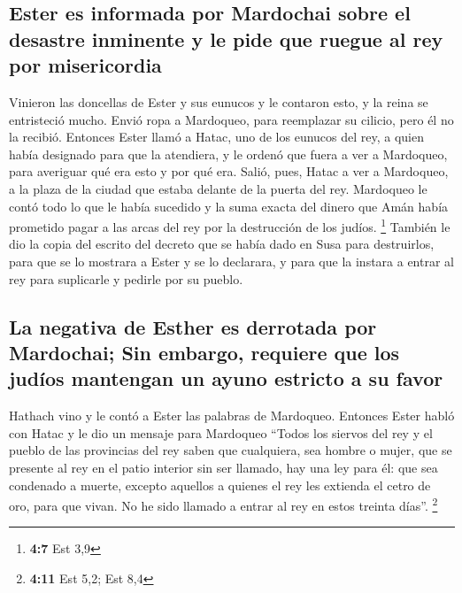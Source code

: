 \hypertarget{ester-es-informada-por-mardochai-sobre-el-desastre-inminente-y-le-pide-que-ruegue-al-rey-por-misericordia}{%
\subsection{Ester es informada por Mardochai sobre el desastre inminente
y le pide que ruegue al rey por
misericordia}\label{ester-es-informada-por-mardochai-sobre-el-desastre-inminente-y-le-pide-que-ruegue-al-rey-por-misericordia}}

 Vinieron las doncellas de Ester y sus eunucos y le
contaron esto, y la reina se entristeció mucho. Envió ropa a Mardoqueo,
para reemplazar su cilicio, pero él no la recibió. 
Entonces Ester llamó a Hatac, uno de los eunucos del rey, a quien había
designado para que la atendiera, y le ordenó que fuera a ver a
Mardoqueo, para averiguar qué era esto y por qué era. 
Salió, pues, Hatac a ver a Mardoqueo, a la plaza de la ciudad que estaba
delante de la puerta del rey.  Mardoqueo le contó todo lo
que le había sucedido y la suma exacta del dinero que Amán había
prometido pagar a las arcas del rey por la destrucción de los judíos.
\footnote{\textbf{4:7} Est 3,9}  También le dio la copia
del escrito del decreto que se había dado en Susa para destruirlos, para
que se lo mostrara a Ester y se lo declarara, y para que la instara a
entrar al rey para suplicarle y pedirle por su pueblo.

\hypertarget{la-negativa-de-esther-es-derrotada-por-mardochai-sin-embargo-requiere-que-los-juduxedos-mantengan-un-ayuno-estricto-a-su-favor}{%
\subsection{La negativa de Esther es derrotada por Mardochai; Sin
embargo, requiere que los judíos mantengan un ayuno estricto a su
favor}\label{la-negativa-de-esther-es-derrotada-por-mardochai-sin-embargo-requiere-que-los-juduxedos-mantengan-un-ayuno-estricto-a-su-favor}}

 Hathach vino y le contó a Ester las palabras de
Mardoqueo.  Entonces Ester habló con Hatac y le dio un
mensaje para Mardoqueo  ``Todos los siervos del rey y el
pueblo de las provincias del rey saben que cualquiera, sea hombre o
mujer, que se presente al rey en el patio interior sin ser llamado, hay
una ley para él: que sea condenado a muerte, excepto aquellos a quienes
el rey les extienda el cetro de oro, para que vivan. No he sido llamado
a entrar al rey en estos treinta días''. \footnote{\textbf{4:11} Est
  5,2; Est 8,4}


